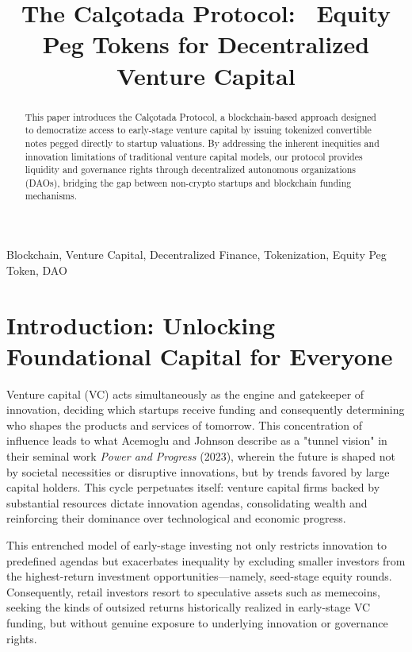 \documentclass[conference]{IEEEtran}
\begin{document}
\title{The Calçotada Protocol: \ Equity Peg Tokens for Decentralized Venture Capital}

\author{
}

\maketitle

\begin{abstract}
This paper introduces the Calçotada Protocol, a blockchain-based approach designed to democratize access to early-stage venture capital by issuing tokenized convertible notes pegged directly to startup valuations. By addressing the inherent inequities and innovation limitations of traditional venture capital models, our protocol provides liquidity and governance rights through decentralized autonomous organizations (DAOs), bridging the gap between non-crypto startups and blockchain funding mechanisms.
\end{abstract}

\begin{IEEEkeywords}
Blockchain, Venture Capital, Decentralized Finance, Tokenization, Equity Peg Token, DAO
\end{IEEEkeywords}

\section{Introduction: Unlocking Foundational Capital for Everyone}

Venture capital (VC) acts simultaneously as the engine and gatekeeper of innovation, deciding which startups receive funding and consequently determining who shapes the products and services of tomorrow. This concentration of influence leads to what Acemoglu and Johnson describe as a "tunnel vision" in their seminal work \textit{Power and Progress} (2023), wherein the future is shaped not by societal necessities or disruptive innovations, but by trends favored by large capital holders. This cycle perpetuates itself: venture capital firms backed by substantial resources dictate innovation agendas, consolidating wealth and reinforcing their dominance over technological and economic progress.

This entrenched model of early-stage investing not only restricts innovation to predefined agendas but exacerbates inequality by excluding smaller investors from the highest-return investment opportunities—namely, seed-stage equity rounds. Consequently, retail investors resort to speculative assets such as memecoins, seeking the kinds of outsized returns historically realized in early-stage VC funding, but without genuine exposure to underlying innovation or governance rights.
\end{document}
